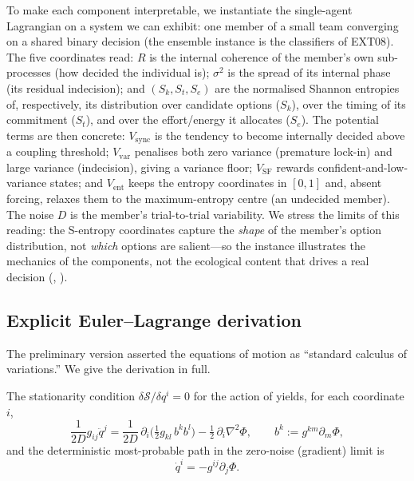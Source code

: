 \documentclass[11pt,twocolumn,a4paper]{article}
\newcommand{\Sk}{S_k}
\newcommand{\St}{S_t}
\newcommand{\Se}{S_e}
\newcommand{\Pot}{\Phi}
\newcommand{\Ord}{R}
\begin{document}
\begin{remark}
\label{rem:concrete-lagrangian}
To make each component interpretable, we instantiate the single-agent
Lagrangian on a system we can exhibit: one member of a small team converging on
a shared binary decision (the ensemble instance is the classifiers of EXT08). The
five coordinates read: $\Ord$ is the internal coherence of the member's own
sub-processes (how decided the individual is); $\sigma^2$ is the spread of its
internal phase (its residual indecision); and $(\Sk,\St,\Se)$ are the normalised
Shannon entropies of, respectively, its distribution over candidate options
($\Sk$), over the timing of its commitment ($\St$), and over the effort/energy it
allocates ($\Se$). The potential terms are then concrete: $V_{\mathrm{sync}}$ is
the tendency to become internally decided above a coupling threshold;
$V_{\mathrm{var}}$ penalises both zero variance (premature lock-in) and large
variance (indecision), giving a variance floor; $V_{\mathrm{SF}}$ rewards
confident-and-low-variance states; and $V_{\mathrm{ent}}$ keeps the entropy
coordinates in $[0,1]$ and, absent forcing, relaxes them to the
maximum-entropy centre (an undecided member). The noise $D$ is the member's
trial-to-trial variability. We stress the limits of this reading: the S-entropy
coordinates capture the \emph{shape} of the member's option distribution, not
\emph{which} options are salient---so the instance illustrates the mechanics of
the components, not the ecological content that drives a real decision
(, ).
\end{remark}

\subsection{Explicit Euler--Lagrange derivation}

The preliminary version asserted the equations of motion as ``standard calculus
of variations.'' We give the derivation in full.

\begin{theorem}\label{thm:EL}
The stationarity condition $\delta\mathcal{S}/\delta q^i=0$ for the action of
 yields, for each coordinate $i$,
\begin{equation}
\frac{1}{2D}g_{ij}\ddot q^j
=\frac{1}{2D}\,\partial_i\!\Big(\tfrac12 g_{kl}\,b^k b^l\Big)
-\tfrac12\,\partial_i\nabla^2\Pot,
\qquad b^k:=g^{km}\partial_m\Pot,
\label{eq:EL-second-order}
\end{equation}
and the deterministic most-probable path in the zero-noise (gradient) limit is
\begin{equation}
\dot q^i=-g^{ij}\partial_j\Pot.
\label{eq:gradflow}
\end{equation}
\end{theorem}
\end{document}
